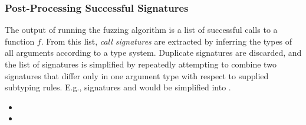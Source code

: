 

\subsubsection{Post-Processing Successful Signatures}

The output of running the fuzzing algorithm is a list of successful calls to a function $f$.
From this list, \textit{call signatures} are extracted by inferring the types of all arguments according to a type system.
Duplicate signatures are discarded, and the list of signatures is simplified by repeatedly attempting to combine two signatures that differ only in one argument type with respect to supplied subtyping rules.
E.g., signatures  and  would be simplified into .

\begin{itemize}
    \item {}
    \item {}
\end{itemize}

